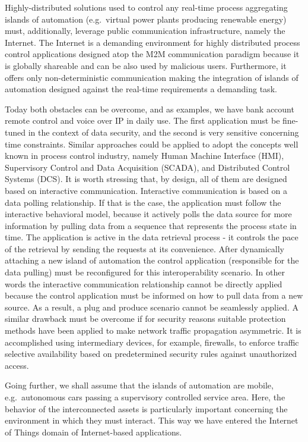 \documentclass[runningheads]{llncs}
\begin{document}
Highly-distributed solutions used to control any real-time process aggregating islands of automation (e.g.~virtual power plants producing renewable energy) must, additionally, leverage public communication infrastructure, namely the Internet. The Internet is a demanding environment for highly distributed process control applications designed atop the M2M communication paradigm because it is globally shareable and can be also used by malicious users. Furthermore, it offers only non-deterministic communication making the integration of islands of automation designed against the real-time requirements a demanding task.

Today both obstacles can be overcome, and as examples, we have bank account remote control and voice over IP in daily use. The first application must be fine-tuned in the context of data security, and the second is very sensitive concerning time constraints. Similar approaches could be applied to adopt the concepts well known in process control industry, namely Human Machine Interface (HMI), Supervisory Control and Data Acquisition (SCADA), and Distributed Control Systems (DCS). It is worth stressing that, by design, all of them are designed based on interactive communication. Interactive communication is based on a data polling relationship. If that is the case, the application must follow the interactive behavioral model, because it actively polls the data source for more information by pulling data from a sequence that represents the process state in time. The application is active in the data retrieval process - it controls the pace of the retrieval by sending the requests at its convenience. After dynamically attaching a new island of automation the control application (responsible for the data pulling) must be reconfigured for this interoperability scenario. In other words the interactive communication relationship cannot be directly applied because the control application must be informed on how to pull data from a new source. As a result, a plug and produce scenario \cite{PlugProduceByModellingSkills} cannot be seamlessly applied. A similar drawback must be overcome if for security reasons suitable protection methods have been applied to make network traffic propagation asymmetric. It is accomplished using intermediary devices, for example, firewalls, to enforce traffic selective availability based on predetermined security rules against unauthorized access.

Going further, we shall assume that the islands of automation are mobile, e.g.~autonomous cars passing a supervisory controlled service area. Here, the behavior of the interconnected assets is particularly important concerning the environment in which they must interact. This way we have entered the Internet of Things domain of Internet-based applications.
\end{document}
